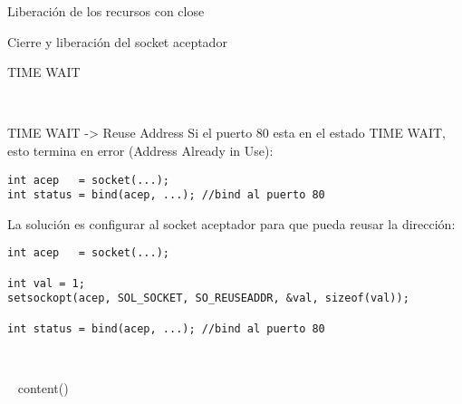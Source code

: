 \begin{frame}{Liberaci\'on de los recursos con close}
\end{frame}

\begin{frame}{Cierre y liberaci\'on del socket aceptador}
\end{frame}

\begin{frame}{TIME WAIT}
\end{frame}
~%

\begin{frame}[fragile]{TIME WAIT -> Reuse Address}
Si el puerto 80 esta en el estado TIME WAIT, esto termina en error (Address Already in Use):
      \begin{lstlisting}[style=normal]
int acep   = socket(...);
int status = bind(acep, ...); //bind al puerto 80
      \end{lstlisting}
\pause
La soluci\'on es configurar al socket aceptador para que pueda reusar la direcci\'on:
      \begin{lstlisting}[style=normal]
int acep   = socket(...);

int val = 1;
setsockopt(acep, SOL_SOCKET, SO_REUSEADDR, &val, sizeof(val));

int status = bind(acep, ...); //bind al puerto 80
      \end{lstlisting}
\end{frame}



~%

~{ content() }~


